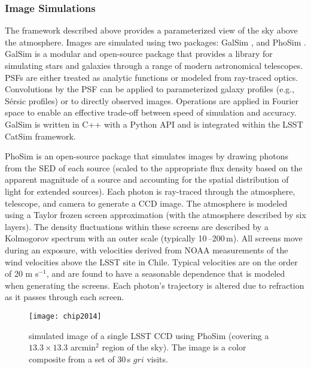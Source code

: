 \subsubsection{Image Simulations}
\label{sec:imsim}

The framework described above provides a parameterized view of the sky
above the atmosphere. Images are simulated using two packages: GalSim
\citep{2015A&C....10..121R}, and PhoSim \citep{2015ApJS..218...14P}. GalSim is a
modular and open-source package that provides a library for simulating
stars and galaxies through a range of modern astronomical
telescopes. PSFs are either treated as
analytic functions or modeled from ray-traced optics. Convolutions by
the PSF can be applied to parameterized galaxy profiles (e.g.,
S\'ersic profiles) or to directly observed images. Operations are
applied in Fourier space to enable an effective trade-off between
speed of simulation and accuracy. GalSim is written in C++ with a
Python API and is integrated within the LSST CatSim framework.

PhoSim is an open-source package that simulates images by drawing
photons from the SED of each source (scaled
to the appropriate flux density based on the apparent magnitude of a
source and accounting for the spatial distribution of light for
extended sources). Each photon is ray-traced through the atmosphere,
telescope, and camera to generate a CCD image. The atmosphere is
modeled using a Taylor frozen screen approximation (with the
atmosphere described by six layers). The density fluctuations within
these screens are described by a Kolmogorov spectrum with an outer
scale (typically 10\,--200\,m). All screens move during an exposure,
with velocities derived from NOAA measurements of the wind velocities
above the LSST site in Chile.  Typical velocities are on the order of
20 m s$^{-1}$, and are found to have a seasonable dependence that is
modeled when generating the screens. Each photon's trajectory is
altered due to refraction as it passes through each screen.


\begin{figure*}
\centerline{\texttt{[image: chip2014]}}
\caption{simulated image of a single LSST CCD using PhoSim
  (covering a $13.3\times13.3$ arcmin$^2$ region of the sky). The
  image is a color composite \citep{2004PASP..116..133L} from a set of 30\,s
  $gri$ visits.}
\label{Fig:ImSimExample}
\end{figure*}

